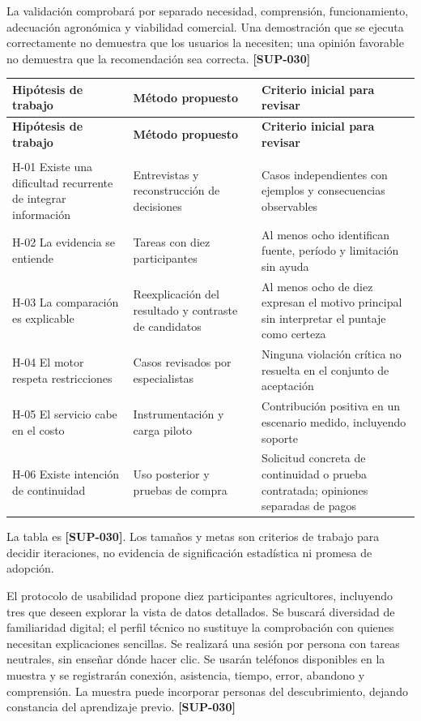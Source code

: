 \documentclass[10pt,a4paper]{article}
\begin{document}
La validación comprobará por separado necesidad, comprensión, funcionamiento, adecuación agronómica y viabilidad comercial. Una demostración que se ejecuta correctamente no demuestra que los usuarios la necesiten; una opinión favorable no demuestra que la recomendación sea correcta. \textbf{[SUP-030]}


\begingroup\small
\begin{longtable}{>{\raggedright\arraybackslash}p{3.647cm}>{\raggedright\arraybackslash}p{5.867cm}>{\raggedright\arraybackslash}p{6.343cm}}
\toprule
\textbf{Hipótesis de trabajo} & \textbf{Método propuesto} & \textbf{Criterio inicial para revisar} \\
\midrule\endfirsthead
\toprule
\textbf{Hipótesis de trabajo} & \textbf{Método propuesto} & \textbf{Criterio inicial para revisar} \\
\midrule\endhead
\midrule\multicolumn{3}{r}{\scriptsize Continúa en la página siguiente}\\\endfoot
\bottomrule\endlastfoot
H-01 Existe una dificultad recurrente de integrar información & Entrevistas y reconstrucción de decisiones & Casos independientes con ejemplos y consecuencias observables \\[3pt]
H-02 La evidencia se entiende & Tareas con diez participantes & Al menos ocho identifican fuente, período y limitación sin ayuda \\[3pt]
H-03 La comparación es explicable & Reexplicación del resultado y contraste de candidatos & Al menos ocho de diez expresan el motivo principal sin interpretar el puntaje como certeza \\[3pt]
H-04 El motor respeta restricciones & Casos revisados por especialistas & Ninguna violación crítica no resuelta en el conjunto de aceptación \\[3pt]
H-05 El servicio cabe en el costo & Instrumentación y carga piloto & Contribución positiva en un escenario medido, incluyendo soporte \\[3pt]
H-06 Existe intención de continuidad & Uso posterior y pruebas de compra & Solicitud concreta de continuidad o prueba contratada; opiniones separadas de pagos \\[3pt]
\end{longtable}
\endgroup

La tabla es \textbf{[SUP-030]}. Los tamaños y metas son criterios de trabajo para decidir iteraciones, no evidencia de significación estadística ni promesa de adopción.


El protocolo de usabilidad propone diez participantes agricultores, incluyendo tres que deseen explorar la vista de datos detallados. Se buscará diversidad de familiaridad digital; el perfil técnico no sustituye la comprobación con quienes necesitan explicaciones sencillas. Se realizará una sesión por persona con tareas neutrales, sin enseñar dónde hacer clic. Se usarán teléfonos disponibles en la muestra y se registrarán conexión, asistencia, tiempo, error, abandono y comprensión. La muestra puede incorporar personas del descubrimiento, dejando constancia del aprendizaje previo. \textbf{[SUP-030]}
\end{document}
